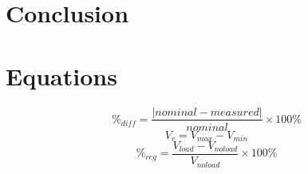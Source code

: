 \documentclass{article}
\begin{document}
\section{Conclusion}
\label{sec:conclusion}

\section{Equations}
\label{sec:equations}

%
\begin{equation}
  \label{eq:percent_diff}
  \%_{diff} = \frac{|nominal - measured|}{nominal}\times 100\%
\end{equation}
%
\begin{equation}
  \label{eq:ripple}
  V_r = V_{max} - V_{min}
\end{equation}
%
\begin{equation}
  \label{eq:volt_reg}
  \%_{reg} = \frac{V_{load} - V_{no load}}{V_{no load}}\times 100\%
\end{equation}
\end{document}
